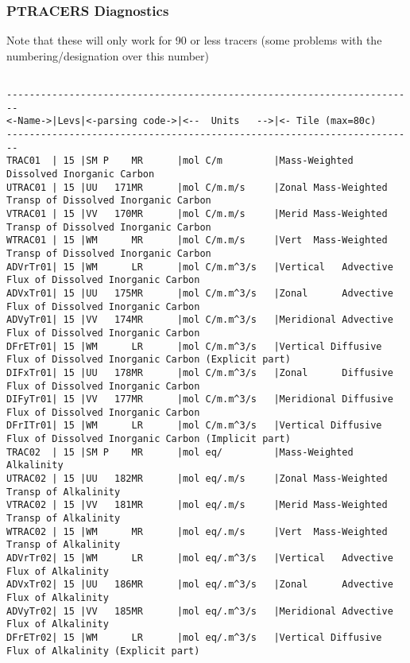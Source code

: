 \subsubsection{PTRACERS Diagnostics}
\label{sec:pkg:ptracers:diagnostics}

Note that these will only work for 90 or less tracers (some
problems with the numbering/designation over this number)

{\footnotesize
\begin{verbatim}

------------------------------------------------------------------------
<-Name->|Levs|<-parsing code->|<--  Units   -->|<- Tile (max=80c) 
------------------------------------------------------------------------
TRAC01  | 15 |SM P    MR      |mol C/m         |Mass-Weighted Dissolved Inorganic Carbon
UTRAC01 | 15 |UU   171MR      |mol C/m.m/s     |Zonal Mass-Weighted Transp of Dissolved Inorganic Carbon
VTRAC01 | 15 |VV   170MR      |mol C/m.m/s     |Merid Mass-Weighted Transp of Dissolved Inorganic Carbon
WTRAC01 | 15 |WM      MR      |mol C/m.m/s     |Vert  Mass-Weighted Transp of Dissolved Inorganic Carbon
ADVrTr01| 15 |WM      LR      |mol C/m.m^3/s   |Vertical   Advective Flux of Dissolved Inorganic Carbon
ADVxTr01| 15 |UU   175MR      |mol C/m.m^3/s   |Zonal      Advective Flux of Dissolved Inorganic Carbon
ADVyTr01| 15 |VV   174MR      |mol C/m.m^3/s   |Meridional Advective Flux of Dissolved Inorganic Carbon
DFrETr01| 15 |WM      LR      |mol C/m.m^3/s   |Vertical Diffusive Flux of Dissolved Inorganic Carbon (Explicit part)
DIFxTr01| 15 |UU   178MR      |mol C/m.m^3/s   |Zonal      Diffusive Flux of Dissolved Inorganic Carbon
DIFyTr01| 15 |VV   177MR      |mol C/m.m^3/s   |Meridional Diffusive Flux of Dissolved Inorganic Carbon
DFrITr01| 15 |WM      LR      |mol C/m.m^3/s   |Vertical Diffusive Flux of Dissolved Inorganic Carbon (Implicit part)
TRAC02  | 15 |SM P    MR      |mol eq/         |Mass-Weighted Alkalinity
UTRAC02 | 15 |UU   182MR      |mol eq/.m/s     |Zonal Mass-Weighted Transp of Alkalinity
VTRAC02 | 15 |VV   181MR      |mol eq/.m/s     |Merid Mass-Weighted Transp of Alkalinity
WTRAC02 | 15 |WM      MR      |mol eq/.m/s     |Vert  Mass-Weighted Transp of Alkalinity
ADVrTr02| 15 |WM      LR      |mol eq/.m^3/s   |Vertical   Advective Flux of Alkalinity
ADVxTr02| 15 |UU   186MR      |mol eq/.m^3/s   |Zonal      Advective Flux of Alkalinity
ADVyTr02| 15 |VV   185MR      |mol eq/.m^3/s   |Meridional Advective Flux of Alkalinity
DFrETr02| 15 |WM      LR      |mol eq/.m^3/s   |Vertical Diffusive Flux of Alkalinity (Explicit part)

\end{verbatim}}
